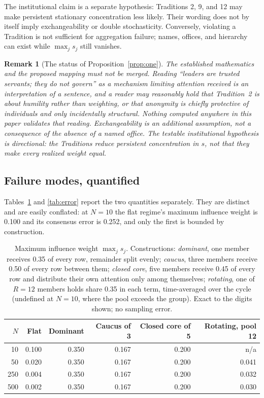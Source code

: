 \documentclass[11pt,a4paper]{article}
\newtheorem{remark}{Remark}
\begin{document}
The institutional claim is a separate hypothesis: Traditions 2, 9, and 12 may
make persistent stationary concentration less likely. Their wording does not by
itself imply exchangeability or double stochasticity. Conversely, violating a
Tradition is not sufficient for aggregation failure; names, offices, and hierarchy
can exist while $\max_j s_j$ still vanishes.

\begin{remark}[The status of Proposition~\ref{prop:one}]
The established mathematics and the proposed mapping must not be merged. Reading
``leaders are trusted servants; they do not govern'' as a mechanism limiting
attention received is an interpretation of a sentence, and a reader may
reasonably hold that Tradition~2 is about humility rather than weighting, or that
anonymity is chiefly protective of individuals and only incidentally structural.
Nothing computed anywhere in this paper validates that reading. Exchangeability
is an additional assumption, not a consequence of the absence of a named office.
The testable institutional hypothesis is directional: the Traditions reduce
persistent concentration in $s$, not that they make every realized weight equal.
\end{remark}

\subsection{Failure modes, quantified}

Tables~\ref{tab:influence} and \ref{tab:error} report the two quantities
separately. They are distinct and are easily conflated: at $N = 10$ the flat
regime's maximum influence weight is 0.100 and its consensus error is 0.252, and
only the first is bounded by construction.

\begin{table}[htbp]\centering\small
\begin{tabular}{@{}rrrrrr@{}}
\toprule
$N$ & Flat & Dominant & Caucus of 3 & Closed core of 5 & Rotating, pool 12 \\
\midrule
10  & 0.100 & 0.350 & 0.167 & 0.200 & n/a \\
50  & 0.020 & 0.350 & 0.167 & 0.200 & 0.041 \\
250 & 0.004 & 0.350 & 0.167 & 0.200 & 0.032 \\
500 & 0.002 & 0.350 & 0.167 & 0.200 & 0.030 \\
\bottomrule
\end{tabular}
\caption{Maximum influence weight $\max_j s_j$. Constructions: \emph{dominant},
one member receives 0.35 of every row, remainder split evenly; \emph{caucus},
three members receive 0.50 of every row between them; \emph{closed core}, five
members receive 0.45 of every row and distribute their own attention only among
themselves; \emph{rotating}, one of $R=12$ members holds share 0.35 in each term,
time-averaged over the cycle (undefined at $N=10$, where the pool exceeds the
group). Exact to the digits shown; no sampling error.}
\label{tab:influence}
\end{table}
\end{document}
